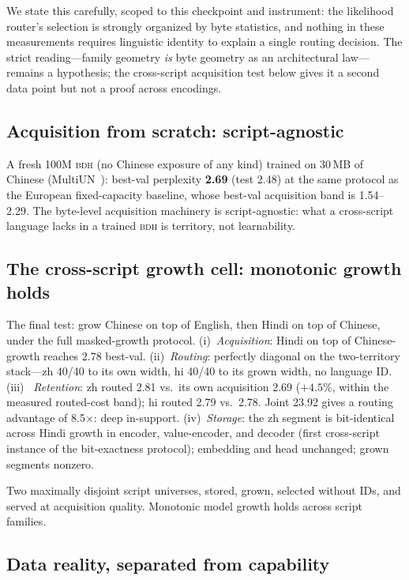 \documentclass[11pt]{article}
\theoremstyle{definition}\newtheorem{definition}{Definition}
\theoremstyle{remark}\newtheorem{remark}{Remark}
\newcommand{\BDH}{\textsc{bdh}}
\begin{document}
We state this carefully, scoped to this checkpoint and instrument: the likelihood
router's selection is strongly organized by byte statistics, and nothing in these
measurements requires linguistic identity to explain a single routing decision. The
strict reading---family geometry \emph{is} byte geometry as an architectural law---remains
a hypothesis; the cross-script acquisition test below gives it a second data point but not
a proof across encodings.

\subsection{Acquisition from scratch: script-agnostic}

A fresh 100M \BDH{} (no Chinese exposure of any kind) trained on 30\,MB of Chinese
(MultiUN~\cite{multiun}): best-val perplexity \textbf{2.69} (test 2.48) at the same protocol as the
European fixed-capacity baseline, whose best-val acquisition band is 1.54--2.29. The byte-level
acquisition machinery is script-agnostic: what a cross-script language lacks in a trained
\BDH{} is territory, not learnability.

\subsection{The cross-script growth cell: monotonic growth holds}

The final test: grow Chinese on top of English, then Hindi on top of Chinese, under the
full masked-growth protocol. (i)~\emph{Acquisition}: Hindi on top of Chinese-growth
reaches 2.78 best-val. (ii)~\emph{Routing}: perfectly diagonal on the two-territory
stack---zh 40/40 to its own width, hi 40/40 to its grown width, no language ID. (iii)~
\emph{Retention}: zh routed 2.81 vs.\ its own acquisition 2.69 ($+4.5\%$, within the
measured routed-cost band); hi routed 2.79 vs.\ 2.78. Joint 23.92 gives a routing advantage of
8.5$\times$: deep in-support. (iv)~\emph{Storage}: the zh segment is bit-identical across
Hindi growth in encoder, value-encoder, and decoder (first cross-script instance of the
bit-exactness protocol); embedding and head unchanged; grown segments nonzero.

Two maximally disjoint script universes, stored, grown, selected without IDs, and served
at acquisition quality. Monotonic model growth holds across script families.

\subsection{Data reality, separated from capability}
\end{document}
